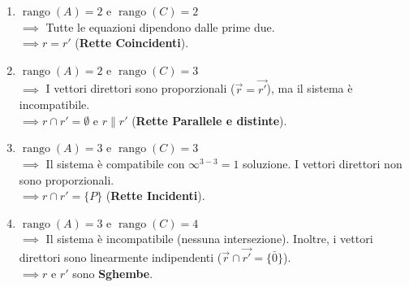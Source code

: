 {    \begin{enumerate}
        \item \(\operatorname{rango}(A) = 2\) e \(\operatorname{rango}(C) = 2\) \\
        \(\implies\) Tutte le equazioni dipendono dalle prime due. \\
        \(\implies r = r'\) (\textbf{Rette Coincidenti}).

        \item \(\operatorname{rango}(A) = 2\) e \(\operatorname{rango}(C) = 3\) \\
        \(\implies\) I vettori direttori sono proporzionali (\(\vec{r} = \vec{r'}\)), ma il sistema è incompatibile. \\
        \(\implies r \cap r' = \emptyset\) e \(r \parallel r'\) (\textbf{Rette Parallele e distinte}).

        \item \(\operatorname{rango}(A) = 3\) e \(\operatorname{rango}(C) = 3\) \\
        \(\implies\) Il sistema è compatibile con \(\infty^{3-3}=1\) soluzione. I vettori direttori non sono proporzionali. \\
        \(\implies r \cap r' = \{P\}\) (\textbf{Rette Incidenti}).

        \item \(\operatorname{rango}(A) = 3\) e \(\operatorname{rango}(C) = 4\) \\
        \(\implies\) Il sistema è incompatibile (nessuna intersezione). Inoltre, i vettori direttori sono linearmente indipendenti (\(\vec{r} \cap \vec{r'} = \{\bar{0}\}\)). \\
        \(\implies r\) e \(r'\) sono \textbf{Sghembe}.
    \end{enumerate}
}

